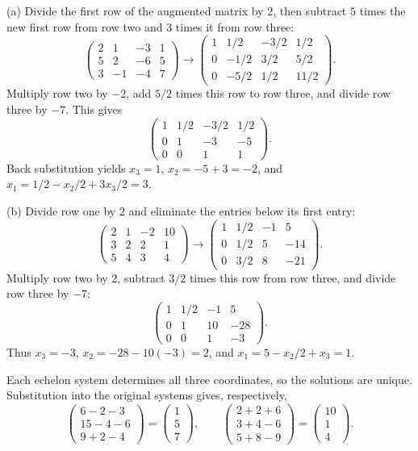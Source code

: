 \begin{solution}
(a) Divide the first row of the augmented matrix by $2$, then subtract
$5$ times the new first row from row two and $3$ times it from row three:
\[
\left(\begin{array}{rrr|r}
2&1&-3&1\\5&2&-6&5\\3&-1&-4&7
\end{array}\right)
\longrightarrow
\left(\begin{array}{rrr|r}
1&1/2&-3/2&1/2\\0&-1/2&3/2&5/2\\0&-5/2&1/2&11/2
\end{array}\right).
\]
Multiply row two by $-2$, add $5/2$ times this row to row three,
and divide row three by $-7$. This gives
\[
\left(\begin{array}{rrr|r}
1&1/2&-3/2&1/2\\0&1&-3&-5\\0&0&1&1
\end{array}\right).
\]
Back substitution yields $x_3=1$, $x_2=-5+3=-2$, and
$x_1=1/2-x_2/2+3x_3/2=3$.

(b) Divide row one by $2$ and eliminate the entries below its first entry:
\[
\left(\begin{array}{rrr|r}
2&1&-2&10\\3&2&2&1\\5&4&3&4
\end{array}\right)
\longrightarrow
\left(\begin{array}{rrr|r}
1&1/2&-1&5\\0&1/2&5&-14\\0&3/2&8&-21
\end{array}\right).
\]
Multiply row two by $2$, subtract $3/2$ times this row from row three,
and divide row three by $-7$:
\[
\left(\begin{array}{rrr|r}
1&1/2&-1&5\\0&1&10&-28\\0&0&1&-3
\end{array}\right).
\]
Thus $x_3=-3$, $x_2=-28-10(-3)=2$, and
$x_1=5-x_2/2+x_3=1$.

Each echelon system determines all three coordinates, so the solutions
are unique. Substitution into the original systems gives, respectively,
\[
\begin{pmatrix}6-2-3\\15-4-6\\9+2-4\end{pmatrix}
=\begin{pmatrix}1\\5\\7\end{pmatrix},
\qquad
\begin{pmatrix}2+2+6\\3+4-6\\5+8-9\end{pmatrix}
=\begin{pmatrix}10\\1\\4\end{pmatrix}.
\]
\end{solution}

